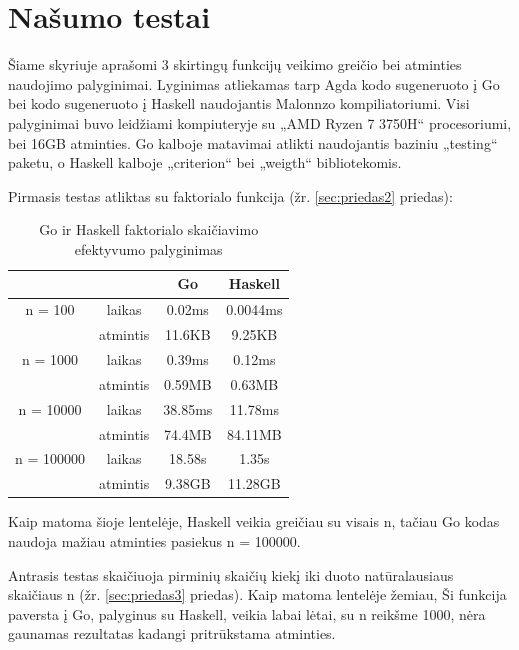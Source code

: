 \documentclass{VUMIFPSkursinis}
\begin{document}
\section{Našumo testai}
Šiame skyriuje aprašomi 3 skirtingų funkcijų veikimo greičio bei atminties naudojimo palyginimai. Lyginimas atliekamas tarp Agda kodo sugeneruoto į Go bei kodo sugeneruoto į Haskell naudojantis Malonnzo kompiliatoriumi. Visi palyginimai buvo leidžiami kompiuteryje su  „AMD Ryzen 7 3750H“ procesoriumi, bei 16GB atminties. Go kalboje matavimai atlikti naudojantis baziniu „testing“ paketu, o Haskell kalboje „criterion“ bei „weigth“ bibliotekomis. 
\par Pirmasis testas atliktas su faktorialo funkcija (žr. \ref{sec:priedas2} priedas): 
\begin{center}
	\centering
	\begin{table}[H]
		\caption{Go ir Haskell faktorialo skaičiavimo efektyvumo palyginimas}
		\centering
	\begin{tabular}{ cccc } 
	& & \textbf{Go} & \textbf{Haskell}  \\
	\midrule
	n = 100 & laikas & 0.02ms & 0.0044ms    \\
	& atmintis & 11.6KB & 9.25KB \\
	\midrule
	n = 1000 & laikas & 0.39ms & 0.12ms  \\
	& atmintis & 0.59MB & 0.63MB \\
	\midrule
	n = 10000 & laikas & 38.85ms & 11.78ms  \\
	& atmintis & 74.4MB & 84.11MB \\
	\midrule
	n = 100000 & laikas & 18.58s & 1.35s  \\
	& atmintis & 9.38GB & 11.28GB \\
	\end{tabular}
	\centering
\end{table}
\end{center}
	Kaip matoma šioje lentelėje, Haskell veikia greičiau su visais n, tačiau Go kodas naudoja mažiau atminties pasiekus n = 100000. 
	\par Antrasis testas skaičiuoja pirminių skaičių kiekį iki duoto natūralausiaus skaičiaus n (žr. \ref{sec:priedas3} priedas). Kaip matoma lentelėje žemiau, Ši funkcija paversta į Go, palyginus su Haskell, veikia labai lėtai, su n reikšme 1000, nėra gaunamas rezultatas kadangi pritrūkstama atminties.
\end{document}
